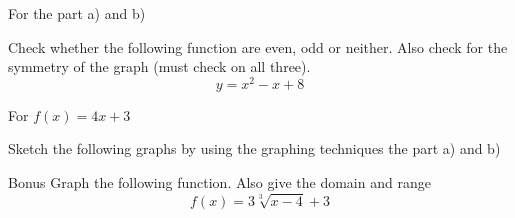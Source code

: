 \documentclass[11pt]{exam}
\begin{document}
\begin{questions}
\newpage
\addpoints
\question[10] For the part a) and b)


\vspace{8cm}
\addpoints
\question[10] Check whether the following function are even, odd or neither. Also check for the symmetry of the graph (must check on all three).
\[y=x^2-x+8\]

\newpage
\addpoints
\question[10] For $f(x)=4x+3$ 
\vspace{8cm}
\addpoints
\question[10] Sketch the following graphs by using the graphing techniques the part a) and b)

\vspace{8cm}
\addpoints
Bonus
\question[5] Graph the following function. Also give the domain and range \[f(x)=3\sqrt[3]{x-4}+3\]
\end{questions}
\end{document}
